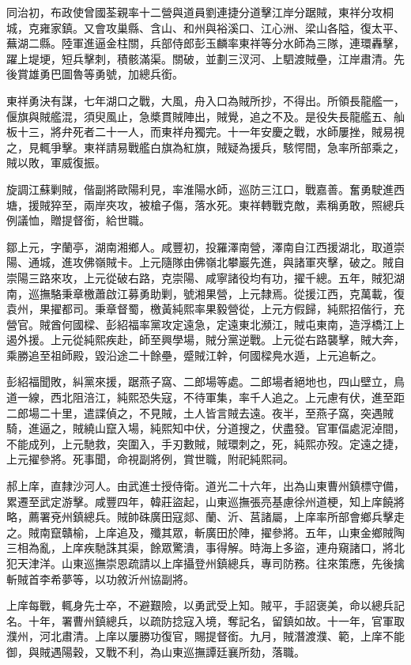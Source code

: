 \begin{pinyinscope}
同治初，布政使曾國荃親率十二營與道員劉連捷分道擊江岸分踞賊，東祥分攻桐城，克雍家鎮。又會攻巢縣、含山、和州與裕溪口、江心洲、梁山各隘，復太平、蕪湖二縣。陸軍進逼金柱關，兵部侍郎彭玉麟率東祥等分水師為三隊，連環轟擊，躍上堤埂，短兵擊刺，積骸滿渠。關破，並劃三汊河、上駟渡賊壘，江岸肅清。先後賞雄勇巴圖魯等勇號，加總兵銜。

東祥勇決有謀，七年湖口之戰，大風，舟入口為賊所抄，不得出。所領長龍艦一，偃旗與賊艦混，須臾風止，急槳貫賊陣出，賊覺，追之不及。是役失長龍艦五、舢板十三，將弁死者二十一人，而東祥舟獨完。十一年安慶之戰，水師屢挫，賊易視之，見輒爭擊。東祥請易戰艦白旗為紅旗，賊疑為援兵，駭愕間，急率所部乘之，賊以敗，軍威復振。

旋調江蘇剿賊，偕副將歐陽利見，率淮陽水師，巡防三江口，戰嘉善。奮勇駛進西塘，援賊猝至，兩岸夾攻，被槍子傷，落水死。東祥轉戰克敵，素稱勇敢，照總兵例議恤，贈提督銜，給世職。

鄒上元，字蘭亭，湖南湘鄉人。咸豐初，投羅澤南營，澤南自江西援湖北，取道崇陽、通城，進攻佛嶺賊卡。上元隨隊由佛嶺北攀巖先進，與諸軍夾擊，破之。賊自崇陽三路來攻，上元從破右路，克崇陽、咸寧諸役均有功，擢千總。五年，賊犯湖南，巡撫駱秉章檄蕭啟江募勇助剿，號湘果營，上元隸焉。從援江西，克萬載，復袁州，果擢都司。秉章督蜀，檄黃純熙率果毅營從，上元方假歸，純熙招偕行，充營官。賊酋何國樑、彭紹福率黨攻定遠急，定遠東北瀕江，賊屯東南，造浮橋江上遏外援。上元從純熙疾赴，師至興學場，賊分黨逆戰。上元從右路襲擊，賊大奔，乘勝追至祖師殿，毀沿途二十餘壘，蹙賊江幹，何國樑鳧水遁，上元追斬之。

彭紹福聞敗，糾黨來援，踞燕子窩、二郎場等處。二郎場者絕地也，四山壁立，鳥道一線，西北阻涪江，純熙恐失寇，不待軍集，率千人追之。上元慮有伏，進至距二郎場二十里，遣諜偵之，不見賊，土人皆言賊去遠。夜半，至燕子窩，突遇賊騎，進逼之，賊繞山竄入場，純熙知中伏，分道搜之，伏盡發。官軍偪處泥淖間，不能成列，上元馳救，突圍入，手刃數賊，賊環刺之，死，純熙亦歿。定遠之捷，上元擢參將。死事聞，命視副將例，賞世職，附祀純熙祠。

郝上庠，直隸沙河人。由武進士授侍衛。道光二十六年，出為山東曹州鎮標守備，累遷至武定游擊。咸豐四年，韓莊盜起，山東巡撫張亮基慮徐州道梗，知上庠饒將略，薦署兗州鎮總兵。賊帥硃廣田寇郯、蘭、沂、莒諸屬，上庠率所部會鄉兵擊走之。賊南竄贛榆，上庠追及，殲其眾，斬廣田於陣，擢參將。五年，山東金鄉賊陶三相為亂，上庠疾馳誅其渠，餘眾驚潰，事得解。時海上多盜，連舟窺諸口，將北犯天津洋。山東巡撫崇恩疏請以上庠攝登州鎮總兵，專司防務。往來策應，先後擒斬賊首李希夢等，以功敘沂州協副將。

上庠每戰，輒身先士卒，不避艱險，以勇武受上知。賊平，手詔褒美，命以總兵記名。十年，署曹州鎮總兵，以疏防捻寇入境，奪記名，留鎮如故。十一年，官軍取濮州，河北肅清。上庠以屢勝功復官，賜提督銜。九月，賊潛渡濮、範，上庠不能御，與賊遇陽穀，又戰不利，為山東巡撫譚廷襄所劾，落職。


\end{pinyinscope}
